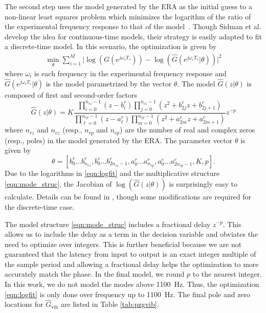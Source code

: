 \documentclass[twocolumn,twoside]{IEEEtran}
\newcommand{\hGv}{\ensuremath{\hat{G}_{\text{vib}}}\xspace}
\begin{document}
The second step uses the model generated by the ERA as the initial guess to a non-linear least squares problem which minimizes the logarithm of the ratio of the experimental frequency response to that of the model~\cite{sidman_parametric_1991}. Though Sidman et al. develop the idea for continuous-time models, their strategy is easily adapted to fit a discrete-time model. In this scenario, the optimization is given by
\begin{align}
\min_{\theta} \sum_{i=1}^M\bigl| \log(G(e^{j\omega_iT_s})) - \log(\hat{G}(e^{j\omega_iT_s}|\theta))\bigr|^2
\label{eqn:logfit}
\end{align}
where $\omega_i$ is each frequency in the experimental frequency response and $\hat{G}(e^{j\omega_iT_s}|\theta)$ is the model parametrized by the vector $\theta$. The model $\hat{G}(z|\theta)$ is composed of first and second-order factors
\begin{equation}
  \hat{G}(z|\theta) =K \frac{\prod_{i=0}^{n_{rz}-1} (z-b^r_i) \prod_{j=0}^{n_{cz}-1}(z^2 +b^c_{2j}z + b^c_{2j+1})}
  { \prod_{\ell=0}^{n_{rp}-1}(z-a^r_\ell) \prod_{m=0}^{n_{cp}-1}(z^2 +a^c_{2m}z + a^c_{2m+1})}z^{-p} \label{eqn:mode_struc}
\end{equation}
where $n_{rz}$ and $n_{cz}$ (resp., $n_{rp}$ and $n_{cp}$) are the number of real and complex zeros (resp., poles) in the model generated by the ERA. The parameter vector $\theta$ is given by 
\begin{equation}
\theta = [b^r_0\dots b^r_{n_{rz}}, b^c_{0}\dots b^c_{2n_{cz}-1}, a^r_0\dots a^r_{n_{rp}}, a^c_{0}\dots a^c_{2n_{cp}-1}, K, p].\nonumber
\end{equation}
Due to the logarithms in \eqref{eqn:logfit} and the multiplicative structure \eqref{eqn:mode_struc}, the Jacobian of $\log(\hat{G}(z|\theta))$ is surprisingly easy to calculate. Details can be found in \cite{sidman_parametric_1991}, though some modifications are required for the discrete-time case. 

The model structure \eqref{eqn:mode_struc} includes a fractional delay $z^{-p}$. This allows us to include the delay as a term in the decision variable and obviates the need to optimize over integers. This is further beneficial because we are not guaranteed that the latency from input to output is an exact integer multiple of the sample period and allowing a fractional delay helps the optimization to more accurately match the phase. In the final model, we round $p$ to the nearest integer. In this work, we do not model the modes above 1100~Hz. Thus, the optimization \eqref{eqn:logfit} is only done over frequency up to 1100~Hz. The final pole and zero locations for $\hGv$ are listed in Table \ref{tab:pzgvib}.
\end{document}
